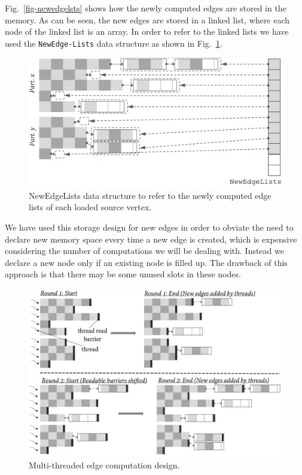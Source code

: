 \documentclass[10pt,preprint]{sigplanconf}
\begin{document}
Fig.~\ref{fig-newedgelsts} shows how the newly computed edges are stored in the memory. As can be seen, the new edges are stored in a linked list, where each node of the linked list is an array. In order to refer to the linked lists we have used the \texttt{NewEdge-Lists} data structure as shown in Fig.~\ref{fig-newedgelstsencap}.

\begin{figure}[!htbp]
	\begin{center}
		\includegraphics[scale=0.27]{Figures/newedgelstsencap.pdf}
	\end{center}
	\caption{NewEdgeLists data structure to refer to the newly computed edge lists of each loaded source vertex.}
	\label{fig-newedgelstsencap}
\end{figure}



We have used this storage design for new edges in order to obviate the need to declare new memory space every time a new edge is created, which is expensive considering the number of computations we will be dealing with. Instead we declare a new node only if an existing node is filled up. The drawback of this approach is that there may be some unused slots in these nodes. 

\begin{figure}[!htbp]
	\begin{center}
		\includegraphics[scale=0.5]{Figures/multithrd1.pdf}
	\end{center}
	\caption{Multi-threaded edge computation design.}
	\label{fig-multithrd1}
\end{figure}
\end{document}
